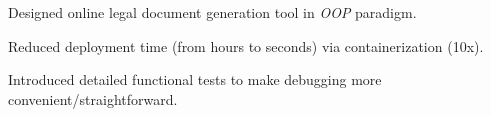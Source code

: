 \documentclass[9pt,a4paper]{extarticle}
\begin{document}
\begin{customitemize}
    \item {}
    \begin{customitemize}
        \item {}
        \begin{customitemize}
            \item[] {}
            \item{Designed online legal document generation tool in \textit{OOP} paradigm.}
        \end{customitemize}
        \item {}
        \begin{customitemize}
            \item[] {}
            \item{Reduced deployment time (from hours to seconds) via containerization (10x).}
            \item{Introduced detailed functional tests to make debugging more convenient/straightforward.}
        \end{customitemize}
        \item {}
        \begin{customitemize}
            \item[] {}
        \end{customitemize}
    \end{customitemize}

    \item {}
    \begin{customitemize}
        \item {}
        \item {}
        \begin{customitemize}
            \item[] {}
        \end{customitemize}
    \end{customitemize}


\end{customitemize}
\end{document}
